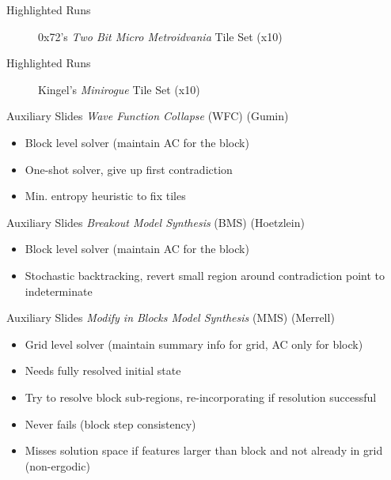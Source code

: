 \documentclass{beamer}
\begin{document}
  \begin{frame}[fragile]{Highlighted Runs}
    \begin{figure}
      0x72's \textit{Two Bit Micro Metroidvania} Tile Set (x10)
    \end{figure}
  \end{frame}

  \begin{frame}[fragile]{Highlighted Runs}
    \begin{figure}
      Kingel's \textit{Minirogue} Tile Set (x10)
    \end{figure}
  \end{frame}

  \begin{frame}[fragile]{Auxiliary Slides}
    \textit{Wave Function Collapse} (WFC) (Gumin)
    \begin{itemize}
      \item Block level solver (maintain AC for the block)
      \item One-shot solver, give up first contradiction
      \item Min. entropy heuristic to fix tiles
    \end{itemize}
  \end{frame}

  \begin{frame}[fragile]{Auxiliary Slides}
    \textit{Breakout Model Synthesis} (BMS) (Hoetzlein)
    \begin{itemize}
      \item Block level solver (maintain AC for the block)
      \item Stochastic backtracking, revert small region around contradiction point to indeterminate
    \end{itemize}
  \end{frame}

  \begin{frame}[fragile]{Auxiliary Slides}
    \textit{Modify in Blocks Model Synthesis} (MMS) (Merrell)
    \begin{itemize}
      \item Grid level solver (maintain summary info for grid, AC only for block)
      \item Needs fully resolved initial state
      \item Try to resolve block sub-regions, re-incorporating if resolution successful
      \item Never fails (block step consistency)
      \item Misses solution space if features larger than block and not already in grid (non-ergodic)
    \end{itemize}
  \end{frame}
\end{document}
